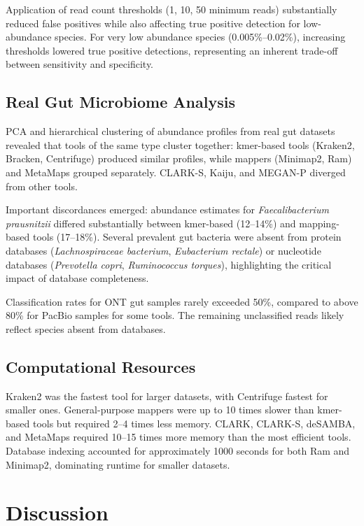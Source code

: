 \documentclass[11pt]{article}
\begin{document}
Application of read count thresholds (1, 10, 50 minimum reads) substantially reduced false positives while also affecting true positive detection for low-abundance species. For very low abundance species (0.005\%--0.02\%), increasing thresholds lowered true positive detections, representing an inherent trade-off between sensitivity and specificity.

\subsection{Real Gut Microbiome Analysis}

PCA and hierarchical clustering of abundance profiles from real gut datasets revealed that tools of the same type cluster together: kmer-based tools (Kraken2, Bracken, Centrifuge) produced similar profiles, while mappers (Minimap2, Ram) and MetaMaps grouped separately. CLARK-S, Kaiju, and MEGAN-P diverged from other tools.

Important discordances emerged: abundance estimates for \textit{Faecalibacterium prausnitzii} differed substantially between kmer-based (12--14\%) and mapping-based tools (17--18\%). Several prevalent gut bacteria were absent from protein databases (\textit{Lachnospiraceae bacterium}, \textit{Eubacterium rectale}) or nucleotide databases (\textit{Prevotella copri}, \textit{Ruminococcus torques}), highlighting the critical impact of database completeness.

Classification rates for ONT gut samples rarely exceeded 50\%, compared to above 80\% for PacBio samples for some tools. The remaining unclassified reads likely reflect species absent from databases.

\subsection{Computational Resources}

Kraken2 was the fastest tool for larger datasets, with Centrifuge fastest for smaller ones. General-purpose mappers were up to 10 times slower than kmer-based tools but required 2--4 times less memory. CLARK, CLARK-S, deSAMBA, and MetaMaps required 10--15 times more memory than the most efficient tools. Database indexing accounted for approximately 1000 seconds for both Ram and Minimap2, dominating runtime for smaller datasets.

\section{Discussion}
\end{document}
